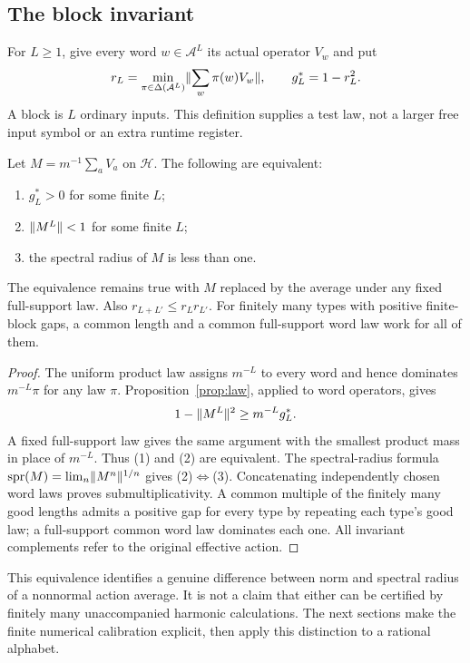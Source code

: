 \subsection{The block invariant}
For $L\ge1$, give every word $w\in\mathcal A^L$ its actual operator $V_w$ and put
\begin{equation}\label{eq:block-gap}
 r_L=\min_{\pi\in\Delta(\mathcal A^L)}\lVert\sum_w\pi(w)V_w\rVert,
 \qquad g_L^*=1-r_L^2.
\end{equation}
A block is $L$ ordinary inputs. This definition supplies a test law, not a larger free input symbol or an extra runtime register.

\begin{theorem}\label{thm:block-gap}
Let $M=m^{-1}\sum_aV_a$ on $\mathcal H$. The following are equivalent:
\begin{enumerate}
\item $g_L^*>0$ for some finite $L$;
\item $\lVert M^L\rVert<1$ for some finite $L$;
\item the spectral radius of $M$ is less than one.
\end{enumerate}
The equivalence remains true with $M$ replaced by the average under any fixed full-support law. Also $r_{L+L'}\le r_Lr_{L'}$. For finitely many types with positive finite-block gaps, a common length and a common full-support word law work for all of them.
\end{theorem}
\begin{proof}
The uniform product law assigns $m^{-L}$ to every word and hence dominates $m^{-L}\pi$ for any law $\pi$. Proposition~\ref{prop:law}, applied to word operators, gives
\begin{equation}\label{eq:block-domination}
 1-\lVert M^L\rVert^2\ge m^{-L}g_L^*.
\end{equation}
A fixed full-support law gives the same argument with the smallest product mass in place of $m^{-L}$. Thus (1) and (2) are equivalent. The spectral-radius formula $\operatorname{spr}(M)=\lim_n\lVert M^n\rVert^{1/n}$ gives (2)$\Leftrightarrow$(3). Concatenating independently chosen word laws proves submultiplicativity. A common multiple of the finitely many good lengths admits a positive gap for every type by repeating each type's good law; a full-support common word law dominates each one. All invariant complements refer to the original effective action.
\end{proof}

This equivalence identifies a genuine difference between norm and spectral radius of a nonnormal action average. It is not a claim that either can be certified by finitely many unaccompanied harmonic calculations. The next sections make the finite numerical calibration explicit, then apply this distinction to a rational alphabet.
